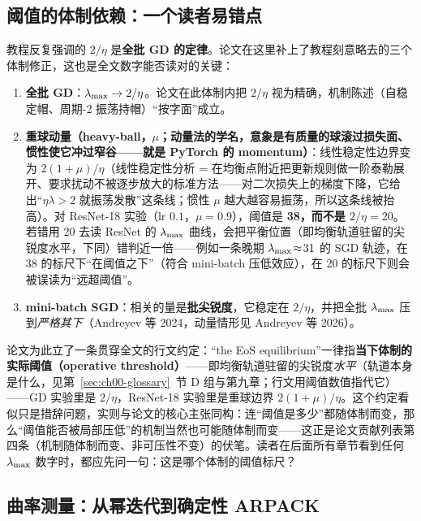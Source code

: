 \subsection{阈值的体制依赖：一个读者易错点}
\label{sec:ch03-threshold}

教程反复强调的 $2/\eta$ 是\textbf{全批 GD
的定律}。论文在这里补上了教程刻意略去的三个体制修正，这也是全文数字能否读对的关键：

\begin{enumerate}
  \item \textbf{全批 GD}：$\lambda_{\max} \to 2/\eta$。论文在此体制内把 $2/\eta$
视为精确，机制陈述（自稳定帽、周期-2 振荡持帽）“按字面”成立。
  \item \textbf{重球动量（heavy-ball，$\mu$；动量法的学名，意象是有质量的球滚过损失面、惯性使它冲过窄谷——就是 PyTorch 的 momentum）}：线性稳定性边界变为
  $2(1{+}\mu)/\eta$（线性稳定性分析 = 在均衡点附近把更新规则做一阶泰勒展开、要求扰动不被逐步放大的标准方法——对二次损失上的梯度下降，它给出“$\eta\lambda>2$ 就振荡发散”这条线；惯性 $\mu$ 越大越容易振荡，所以这条线被抬高）。对 ResNet-18 实验（lr $0.1$，$\mu{=}0.9$），阈值是
  \textbf{38，而不是 $2/\eta{=}20$}。若错用 20 去读 ResNet 的 $\lambda_{\max}$
  曲线，会把平衡位置（即均衡轨道驻留的尖锐度水平，下同）错判近一倍——例如一条晚期 $\lambda_{\max}\!\approx\!31$ 的 SGD 轨迹，在 38
的标尺下“在阈值之下”（符合 mini-batch 压低效应），在 20
的标尺下则会被误读为“远超阈值”。
  \item \textbf{mini-batch SGD}：相关的量是\textbf{批尖锐度}，它稳定在
$2/\eta$，并把全批 $\lambda_{\max}$ 压到\emph{严格其下}（Andreyev 等 2024，动量情形见
Andreyev 等 2026）。
\end{enumerate}

论文为此立了一条贯穿全文的行文约定：“the EoS
equilibrium”一律指\textbf{当下体制的实际阈值（operative threshold）}——即均衡轨道驻留的尖锐度\emph{水平}（轨道本身是什么，见第~\ref{sec:ch00-glossary}~节 D 组与第九章；行文用阈值数值指代它）——GD 实验里是
$2/\eta$，ResNet-18 实验里是重球边界
$2(1{+}\mu)/\eta$。这个约定看似只是措辞问题，实则与论文的核心主张同构：连“阈值是多少”都随体制而变，那么“阈值能否被局部压低”的机制当然也可能随体制而变——这正是论文贡献列表第四条（机制随体制而变、非可压性不变）的伏笔。读者在后面所有章节看到任何
$\lambda_{\max}$ 数字时，都应先问一句：这是哪个体制的阈值标尺？

\subsection{曲率测量：从幂迭代到确定性 ARPACK}
\label{sec:ch03-curvature}

